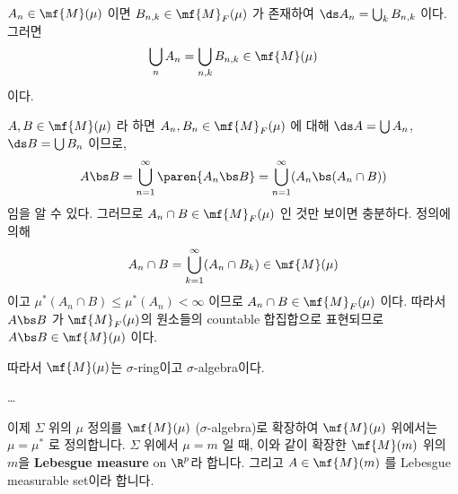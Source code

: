 \(A_n \in \mf{M}(\mu)\) 이면 \(B_{n, k} \in \mf{M}_F(\mu)\) 가 존재하여 \(\ds A_n = \bigcup_k B_{n,k}\) 이다. 그러면
\[
    \bigcup_n A_n = \bigcup_{n, k} B_{n, k} \in \mf{M}(\mu)
\]
이다.

\(A, B \in \mf{M}(\mu)\) 라 하면 \(A_n, B_n \in \mf{M}_F(\mu)\) 에 대해 \(\ds A = \bigcup A_n\), \(\ds B = \bigcup B_n\) 이므로,
\[
    A \bs B = \bigcup_{n=1}^\infty \paren{A_n \bs B} = \bigcup_{n=1}^\infty (A_n\bs(A_n\cap B))
\]
임을 알 수 있다. 그러므로 \(A_n \cap B \in \mf{M}_F(\mu)\) 인 것만 보이면 충분하다. 정의에 의해
\[
    A_n \cap B = \bigcup_{k=1}^\infty (A_n \cap B_k) \in \mf{M}(\mu)
\]
이고 \(\mu^\ast(A_n \cap B) \leq \mu^\ast(A_n) < \infty\) 이므로 \(A_n\cap B \in \mf{M}_F(\mu)\) 이다. 따라서 \(A \bs B\) 가 \(\mf{M}_F(\mu)\)의 원소들의 countable 합집합으로 표현되므로 \(A\bs B \in \mf{M}(\mu)\) 이다.

따라서 \(\mf{M}(\mu)\)는 \(\sigma\)-ring이고 \(\sigma\)-algebra이다.

\dots

이제 \(\Sigma\) 위의 \(\mu\) 정의를 \(\mf{M}(\mu)\) (\(\sigma\)-algebra)로 확장하여 \(\mf{M}(\mu)\) 위에서는 \(\mu = \mu^\ast\) 로 정의합니다. \(\Sigma\) 위에서 \(\mu = m\) 일 때, 이와 같이 확장한 \(\mf{M}(m)\) 위의 \(m\)을 \textbf{Lebesgue measure} on \(\R^p\)라 합니다. 그리고 \(A \in \mf{M}(m)\) 를 Lebesgue measurable set이라 합니다.

\pagebreak
